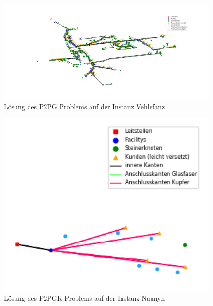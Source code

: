 \documentclass[11pt,a4paper]{article}
\theoremstyle{my_th_style1}
\begin{document}
\begin{figure}[!htbp]
\begin{center}
	\begin{minipage}{15.0cm}
		\includegraphics[width=1\textwidth]{./Bilder/P2PG_Vehlefanz}
		\caption{Lösung des P2PG Problems auf der Instanz Vehlefanz}
		\label{p2pg v pic}
	\end{minipage}
\end{center}
\end{figure}


\begin{figure}[!htbp]
	\begin{center}
		\begin{minipage}{8.0cm}
			\includegraphics[width=1\textwidth]{./Bilder/P2PGK_Naunyn_demand1_duration0}
			\caption{Lösung des P2PGK Problems auf der Instanz Naunyn}
			\label{p2pgk_n_pic}
		\end{minipage}
	\end{center}
\end{figure}
\end{document}
